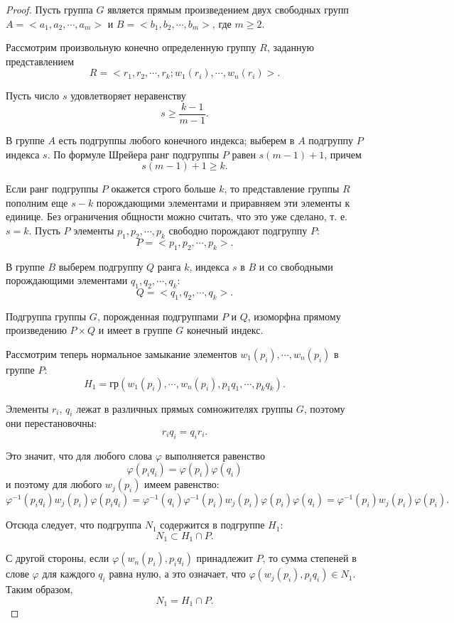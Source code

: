 \documentclass[twoside]{mfitjournal}
\begin{document}
\begin{proof}
Пусть группа $G$ является прямым произведением двух свободных групп $A = <a_1, a_2,\cdots, a_m>$ и $B = < b_1, b_2,\cdots, b_m >$, где $m\geq 2$.

Рассмотрим произвольную конечно определенную группу $R$, заданную представлением 
\[
R = <r_1, r_2,\cdots, r_k; w_1(r_i),\cdots, w_n(r_i)>.
\]

Пусть число $s$ удовлетворяет неравенству
\[
s\geq \dfrac{k-1}{m-1}.
\]

В группе $A$ есть подгруппы любого конечного индекса; выберем в $A$ подгруппу $P$ индекса $s$. По формуле Шрейера ранг подгруппы $P$ равен $s(m-1) + 1$, причем
\[
s(m-1)+1\geq k.
\]

Если ранг подгруппы $P$ окажется строго больше $k$, то представление группы $R$ пополним еще $s-k$  порождающими элементами и приравняем эти элементы к единице. Без ограничения общности можно считать, что это уже сделано, т. е. $s=k$. Пусть $P$ элементы $p_1, p_2,\cdots, p_k$  свободно порождают подгруппу $P$:
\[
P = <p_1, p_2,\cdots, p_k>.
\]

В группе $B$ выберем подгруппу $Q$ ранга $k$, индекса $s$ в  $B$ и со свободными  порождающими элементами $q_1, q_2,\cdots, q_k$:
\[
Q = < q_1, q_2,\cdots, q_k >.
\]

Подгруппа группы $G$, порожденная подгруппами $P$ и $Q$, изоморфна прямому произведению $P\times Q$ и имеет в группе $G$ конечный индекс.

Рассмотрим  теперь нормальное замыкание  элементов $w_1(p_i),\cdots, w_n(p_i)$  в группе $P$:
\[
H_1 = \text{гр}(w_1(p_i),\cdots, w_n(p_i), p_1q_1,\cdots, p_kq_k).
\]

Элементы $r_i$, $q_i$ лежат в различных прямых сомножителях группы $G$, поэтому они перестановочны:
\[
r_iq_i=q_i r_i.
\]

Это значит, что для любого слова $\varphi$ выполняется равенство
\[
\varphi(p_iq_i)= \varphi(p_i) \varphi(q_i)
\]
и поэтому для любого $w_j(p_i)$ имеем равенство:
\[
\varphi^{-1}(p_iq_i) w_j(p_i)\varphi(p_iq_i) = \varphi^{-1}(q_i)\varphi^{-1}(p_i) w_j(p_i)\varphi(p_i)\varphi(q_i) = \varphi^{-1}(p_i) w_j(p_i)\varphi (p_i).
\]

Отсюда следует, что подгруппа $N_1$ содержится в подгруппе $H_1$:
\[
N_1 \subset  H_1 \cap P.
\]

С другой стороны, если  $\varphi( w_n(p_i), p_iq_i)$ принадлежит $P$, то сумма степеней в слове $ \varphi $ для каждого $q_i$ равна нулю, а это означает, что $\varphi(w_j(p_i), p_iq_i)\in N_1$. Таким образом,
\[
N_1=H_1\cap P.
\]


\end{proof}
\end{document}
